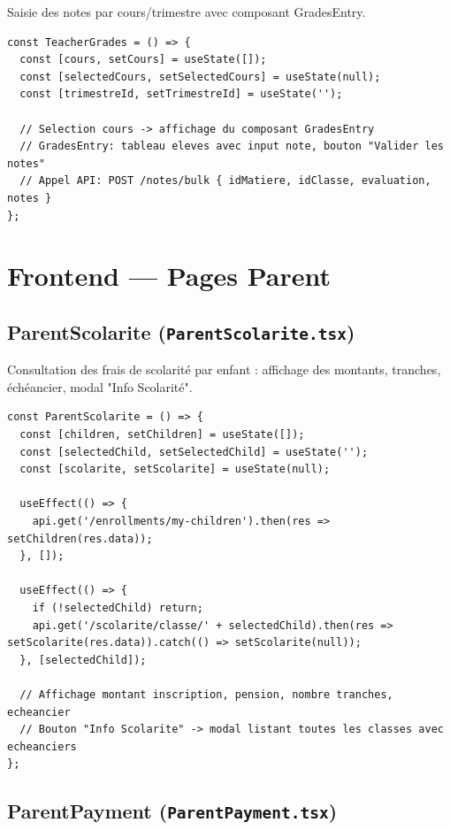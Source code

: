 \documentclass[12pt,a4paper]{article}
\begin{document}
Saisie des notes par cours/trimestre avec composant GradesEntry.

\begin{lstlisting}[style=code]
const TeacherGrades = () => {
  const [cours, setCours] = useState([]);
  const [selectedCours, setSelectedCours] = useState(null);
  const [trimestreId, setTrimestreId] = useState('');

  // Selection cours -> affichage du composant GradesEntry
  // GradesEntry: tableau eleves avec input note, bouton "Valider les notes"
  // Appel API: POST /notes/bulk { idMatiere, idClasse, evaluation, notes }
};
\end{lstlisting}

\newpage

\section{Frontend --- Pages Parent}

\subsection{ParentScolarite (\texttt{ParentScolarite.tsx})}

Consultation des frais de scolarité par enfant : affichage des montants, tranches, échéancier, modal "Info Scolarité".

\begin{lstlisting}[style=code]
const ParentScolarite = () => {
  const [children, setChildren] = useState([]);
  const [selectedChild, setSelectedChild] = useState('');
  const [scolarite, setScolarite] = useState(null);

  useEffect(() => {
    api.get('/enrollments/my-children').then(res => setChildren(res.data));
  }, []);

  useEffect(() => {
    if (!selectedChild) return;
    api.get('/scolarite/classe/' + selectedChild).then(res => setScolarite(res.data)).catch(() => setScolarite(null));
  }, [selectedChild]);

  // Affichage montant inscription, pension, nombre tranches, echeancier
  // Bouton "Info Scolarite" -> modal listant toutes les classes avec echeanciers
};
\end{lstlisting}

\subsection{ParentPayment (\texttt{ParentPayment.tsx})}
\end{document}
